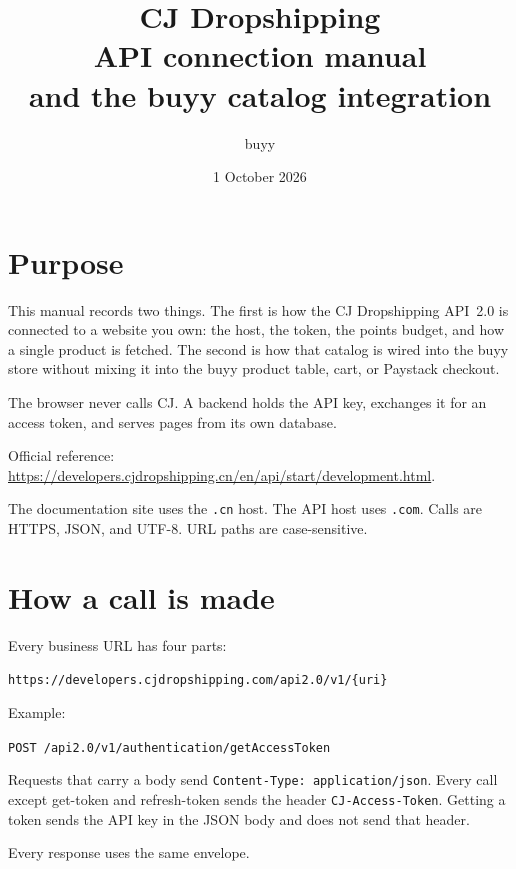 \documentclass[11pt]{article}
\title{\textbf{CJ Dropshipping}\\[0.4em]
\large API connection manual\\
and the buyy catalog integration}
\author{buyy}
\date{1 October 2026}
\begin{document}
\maketitle
\tableofcontents
\newpage

\section{Purpose}

This manual records two things. The first is how the CJ Dropshipping API~2.0 is connected to a website you own: the host, the token, the points budget, and how a single product is fetched. The second is how that catalog is wired into the buyy store without mixing it into the buyy product table, cart, or Paystack checkout.

The browser never calls CJ. A backend holds the API key, exchanges it for an access token, and serves pages from its own database.

Official reference: \url{https://developers.cjdropshipping.cn/en/api/start/development.html}.

The documentation site uses the \texttt{.cn} host. The API host uses \texttt{.com}. Calls are HTTPS, JSON, and UTF-8. URL paths are case-sensitive.

\section{How a call is made}

Every business URL has four parts:

\begin{center}
\texttt{https://developers.cjdropshipping.com/api2.0/v1/\{uri\}}
\end{center}

Example:

\begin{center}
\texttt{POST /api2.0/v1/authentication/getAccessToken}
\end{center}

Requests that carry a body send \texttt{Content-Type: application/json}. Every call except get-token and refresh-token sends the header \texttt{CJ-Access-Token}. Getting a token sends the API key in the JSON body and does not send that header.

Every response uses the same envelope.
\end{document}
